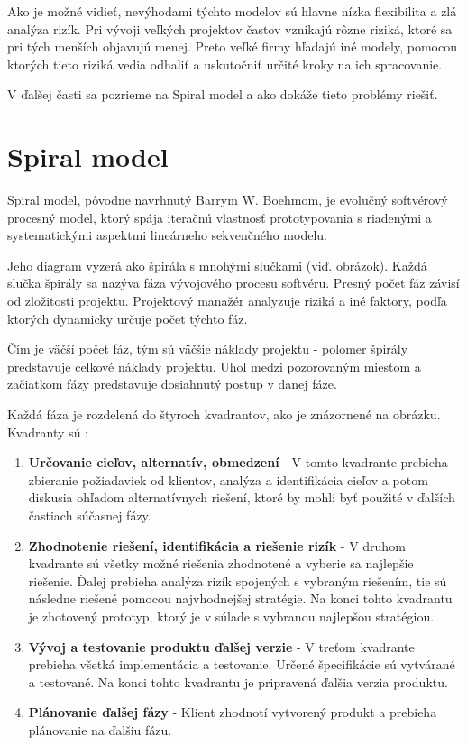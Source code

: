 \documentclass[10pt,twoside,slovak,a4paper]{article}
\begin{document}
Ako je možné vidieť, nevýhodami týchto modelov sú hlavne nízka flexibilita a zlá analýza rizík. Pri vývoji veľkých projektov častov vznikajú rôzne riziká, ktoré sa pri tých menších objavujú menej. Preto veľké firmy hľadajú iné modely, pomocou ktorých tieto riziká vedia odhaliť a uskutočniť určité kroky na ich spracovanie.

V ďalšej časti sa pozrieme na Spiral model a ako dokáže tieto problémy riešiť.

\section{Spiral model} \label{spiralModel}
Spiral model, pôvodne navrhnutý Barrym W. Boehmom, je evolučný softvérový procesný model, ktorý spája iteračnú vlastnosť prototypovania s riadenými a systematickými aspektmi lineárneho sekvenčného modelu. \cite{SpiralModelDef}

Jeho diagram vyzerá ako špirála s mnohými slučkami (viď. obrázok). Každá slučka špirály sa nazýva fáza vývojového procesu softvéru. Presný počet fáz závisí od zložitosti projektu. Projektový manažér analyzuje riziká a iné faktory, podľa ktorých dynamicky určuje počet týchto fáz.

Čím je väčší počet fáz, tým sú väčšie náklady projektu - polomer špirály predstavuje celkové náklady projektu. Uhol medzi pozorovaným miestom a začiatkom fázy predstavuje dosiahnutý postup v danej fáze. \cite{SpiralModelDef1}

Každá fáza je rozdelená do štyroch kvadrantov, ako je znázornené na obrázku. Kvadranty sú \cite{SpiralModelDef1}:
\begin{enumerate}
\item \textbf{Určovanie cieľov, alternatív, obmedzení } - V tomto kvadrante prebieha zbieranie požiadaviek od klientov, analýza a identifikácia cieľov a potom diskusia ohľadom alternatívnych riešení, ktoré by mohli byť použité v ďalších častiach súčasnej fázy.
\item \textbf{Zhodnotenie riešení, identifikácia a riešenie rizík } - V druhom kvadrante sú všetky možné riešenia zhodnotené a vyberie sa najlepšie riešenie. Ďalej prebieha analýza rizík spojených s vybraným riešením, tie sú následne riešené pomocou najvhodnejšej stratégie. Na konci tohto kvadrantu je zhotovený prototyp, ktorý je v súlade s vybranou najlepšou stratégiou.
\item \textbf{Vývoj a testovanie produktu ďalšej verzie} - V treťom kvadrante prebieha všetká implementácia a testovanie. Určené špecifikácie sú vytvárané a testované. Na konci tohto kvadrantu je pripravená ďalšia verzia produktu.
\item \textbf{Plánovanie ďalšej fázy} - Klient zhodnotí vytvorený produkt a prebieha plánovanie na ďalšiu fázu.
\end{enumerate}
\end{document}
